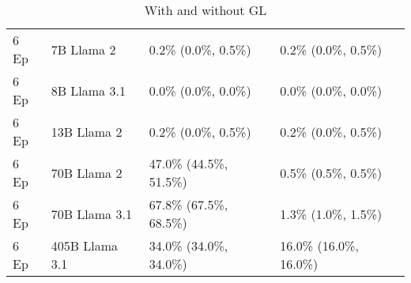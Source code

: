 \begin{table}[h!]
\begin{tabular}{llll}
6 Ep & 7B Llama 2 & 0.2\% (0.0\%, 0.5\%) & 0.2\% (0.0\%, 0.5\%) \\
6 Ep & 8B Llama 3.1 & 0.0\% (0.0\%, 0.0\%) & 0.0\% (0.0\%, 0.0\%) \\
6 Ep & 13B Llama 2 & 0.2\% (0.0\%, 0.5\%) & 0.2\% (0.0\%, 0.5\%) \\
6 Ep & 70B Llama 2 & 47.0\% (44.5\%, 51.5\%) & 0.5\% (0.5\%, 0.5\%) \\
6 Ep & 70B Llama 3.1 & 67.8\% (67.5\%, 68.5\%) & 1.3\% (1.0\%, 1.5\%) \\
6 Ep & 405B Llama 3.1 & 34.0\% (34.0\%, 34.0\%) & 16.0\% (16.0\%, 16.0\%) \\
\bottomrule
\end{tabular}
\caption{With and without GL}
\end{table}
